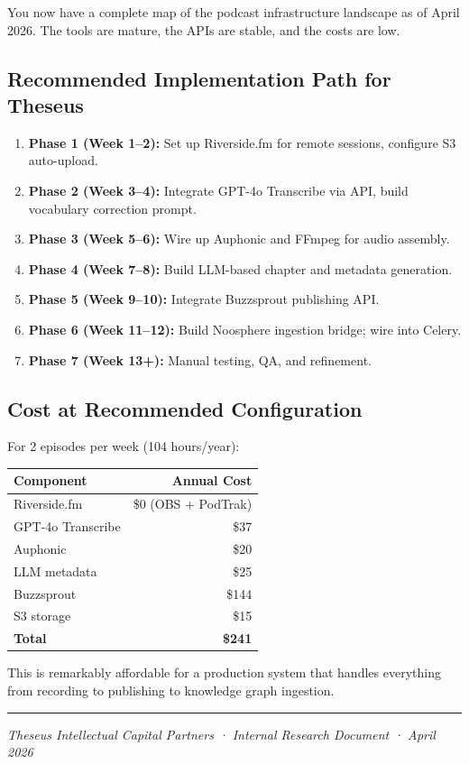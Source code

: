 \documentclass[11pt,letterpaper]{article}
\begin{document}
You now have a complete map of the podcast infrastructure landscape as of April 2026. The tools are mature, the APIs are stable, and the costs are low.

\subsection{Recommended Implementation Path for Theseus}

\begin{enumerate}
  \item \textbf{Phase 1 (Week 1–2):} Set up Riverside.fm for remote sessions, configure S3 auto-upload.
  \item \textbf{Phase 2 (Week 3–4):} Integrate GPT-4o Transcribe via API, build vocabulary correction prompt.
  \item \textbf{Phase 3 (Week 5–6):} Wire up Auphonic and FFmpeg for audio assembly.
  \item \textbf{Phase 4 (Week 7–8):} Build LLM-based chapter and metadata generation.
  \item \textbf{Phase 5 (Week 9–10):} Integrate Buzzsprout publishing API.
  \item \textbf{Phase 6 (Week 11–12):} Build Noosphere ingestion bridge; wire into Celery.
  \item \textbf{Phase 7 (Week 13+):} Manual testing, QA, and refinement.
\end{enumerate}

\subsection{Cost at Recommended Configuration}

For 2 episodes per week (104 hours/year):

\begin{center}
\begin{tabular}{lr}
\toprule
\textbf{Component} & \textbf{Annual Cost} \\
\midrule
Riverside.fm & \$0 (OBS + PodTrak) \\
GPT-4o Transcribe & \$37 \\
Auphonic & \$20 \\
LLM metadata & \$25 \\
Buzzsprout & \$144 \\
S3 storage & \$15 \\
\midrule
\textbf{Total} & \textbf{\$241} \\
\bottomrule
\end{tabular}
\end{center}

This is remarkably affordable for a production system that handles everything from recording to publishing to knowledge graph ingestion.

\vspace{12pt}

\begin{center}
\rule{0.5\linewidth}{0.5pt}
\end{center}

\vspace{6pt}

\noindent\textit{Theseus Intellectual Capital Partners · Internal Research Document · April 2026}
\end{document}
